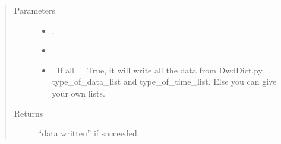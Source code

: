\documentclass[letterpaper,10pt,english]{sphinxmanual}
\begin{document}
\begin{fulllineitems}
\begin{fulllineitems}
\begin{quote}
\begin{description}
\item[{Parameters}] \leavevmode\begin{itemize}
\item {} 
\sphinxAtStartPar
{} \textendash{} .

\item {} 
\sphinxAtStartPar
{} \textendash{} .

\item {} 
\sphinxAtStartPar
{} \textendash{} . If all==True, it will write all the data from DwdDict.py type\_of\_data\_list and type\_of\_time\_list. Else you can give your own lists.

\end{itemize}

\item[{Returns}] \leavevmode
\sphinxAtStartPar
“data written” if succeeded.

\end{description}\end{quote}

\end{fulllineitems}


\end{fulllineitems}

\end{document}
